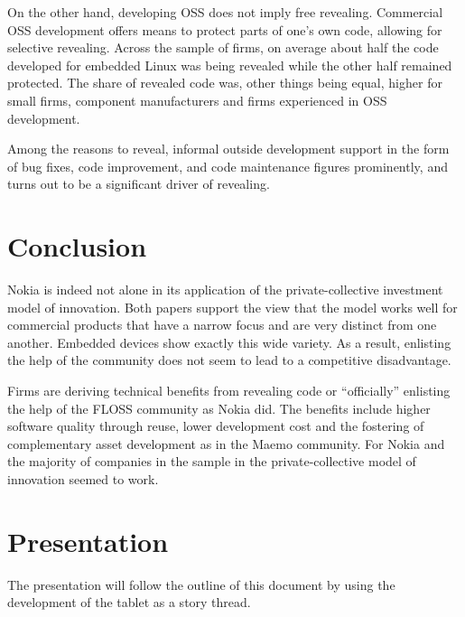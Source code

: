 \documentclass[a4paper]{scrartcl}
\begin{document}
On the other hand, developing OSS does not imply free revealing.
Commercial OSS development offers means to protect parts of one's own code, allowing for selective revealing.
Across the sample of firms, on average about half the code developed for embedded Linux was being revealed while the other half remained protected.
The share of revealed code was, other things being equal, higher for small firms, component manufacturers and firms experienced in OSS development.

Among the reasons to reveal, informal outside development support in the form of bug fixes, code improvement, and code maintenance figures prominently, and turns out to be a significant driver of revealing.

\section{Conclusion}

Nokia is indeed not alone in its application of the private-collective investment model of innovation.
Both papers support the view that the model works well for commercial products that have a narrow focus and are very distinct from one another.
Embedded devices show exactly this wide variety.
As a result, enlisting the help of the community does not seem to lead to a competitive disadvantage.

Firms are deriving technical benefits from revealing code or ``officially'' enlisting the help of the FLOSS community as Nokia did.
The benefits include higher software quality through reuse, lower development cost and the fostering of complementary asset development as in the Maemo community.
For Nokia and the majority of companies in the sample in \textcite{henkel2006selective} the private-collective model of innovation seemed to work.


\section{Presentation}

The presentation will follow the outline of this document by using the development of the tablet as a story thread.
\end{document}
